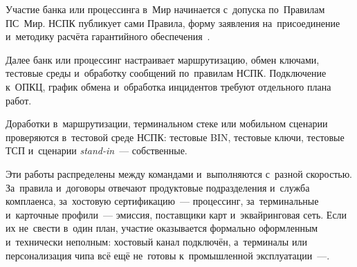 Участие банка или процессинга в~Мир начинается с~допуска по~Правилам ПС~Мир. НСПК публикует сами Правила, форму заявления на~присоединение
и~методику расчёта гарантийного обеспечения~\cite{nspk-mir-rules}.

Далее банк или процессинг настраивает маршрутизацию, обмен ключами, тестовые
среды и~обработку сообщений по~правилам НСПК. Подключение к~ОПКЦ, график обмена
и~обработка инцидентов требуют отдельного плана работ.

Доработки в~маршрутизации, терминальном стеке или мобильном сценарии
проверяются в~тестовой среде НСПК: тестовые BIN, тестовые ключи, тестовые ТСП
и~сценарии \textit{stand-in}~--- собственные.

Эти работы распределены между командами и~выполняются с~разной скоростью.
За~правила и~договоры отвечают продуктовые подразделения и~служба комплаенса,
за~хостовую сертификацию~--- процессинг, за~терминальные и~карточные
профили~--- эмиссия, поставщики карт и~эквайринговая сеть. Если их не~свести
в~один план, участие
оказывается формально оформленным и~технически неполным: хостовый канал подключён,
а~терминалы или персонализация чипа всё ещё не~готовы к~промышленной
эксплуатации~---\nopagebreak {}.
